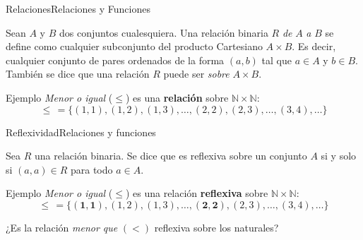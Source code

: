 \documentclass[spanish, c]{beamer}
\begin{document}
\begin{frame}{Relaciones}{Relaciones y Funciones}
    \begin{definition}
        Sean $A$ y $B$ dos conjuntos cualesquiera. Una \alert{relación binaria} $R$ \textit{de} $A$ \textit{a} $B$ se define como cualquier subconjunto del producto Cartesiano $A \times B$.
        Es decir, cualquier conjunto de pares ordenados de la forma $(a,b)$ tal que $a \in A$ y $b \in B$.
        También se dice que una relación $R$ puede ser \textit{sobre} $A \times B$.
    \end{definition} \pause
    \bigskip
    \begin{exampleblock}{Ejemplo}
        \textit{Menor o igual} ($\leq$) es una \textbf{relación} sobre $\mathbb{N} \times \mathbb{N}$:
        \[\leq \, = \{(1,1), (1,2), (1,3), \dots , (2,2), (2,3), \dots , (3,4), \dots \}\]
    \end{exampleblock}
\end{frame}

\begin{frame}{Reflexividad}{Relaciones y funciones}

    \begin{definition}
        Sea $R$ una relación binaria. Se dice que es \alert{reflexiva} sobre un conjunto $A$ si y solo si $(a,a) \in R$ para todo $a \in A$.
    \end{definition} \pause
    \bigskip
    \begin{exampleblock}{Ejemplo}
        \textit{Menor o igual} ($\leq$) es una relación \textbf{reflexiva} sobre $\mathbb{N} \times \mathbb{N}$:
        \[\leq \, = \{\mathbf{(1,1)}, (1,2), (1,3), \dots , \mathbf{(2,2)}, (2,3), \dots , (3,4), \dots \}\]
    \end{exampleblock} \pause
    \bigskip
    ¿Es la relación \textit{menor que} $(<)$ reflexiva sobre los naturales?
\end{frame}
\end{document}
